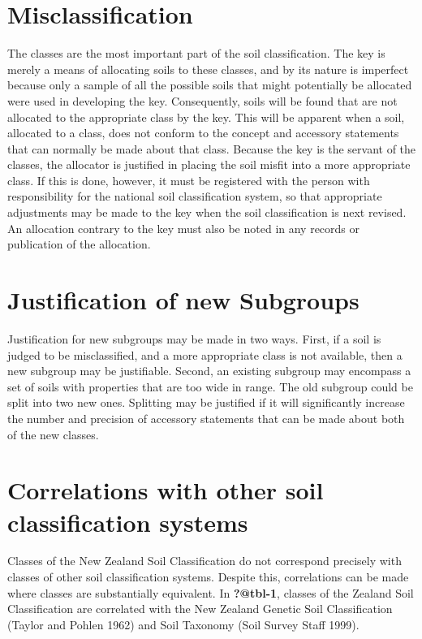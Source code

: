 \documentclass[
  letterpaper,
  DIV=11,
  numbers=noendperiod]{scrreprt}
\begin{document}
\hypertarget{sec-intro-misclass}{%
\section{Misclassification}\label{sec-intro-misclass}}

The classes are the most important part of the soil classification. The
key is merely a means of allocating soils to these classes, and by its
nature is imperfect because only a sample of all the possible soils that
might potentially be allocated were used in developing the key.
Consequently, soils will be found that are not allocated to the
appropriate class by the key. This will be apparent when a soil,
allocated to a class, does not conform to the concept and accessory
statements that can normally be made about that class. Because the key
is the servant of the classes, the allocator is justified in placing the
soil misfit into a more appropriate class. If this is done, however, it
must be registered with the person with responsibility for the national
soil classification system, so that appropriate adjustments may be made
to the key when the soil classification is next revised. An allocation
contrary to the key must also be noted in any records or publication of
the allocation.

\hypertarget{sec-intro-new-sgs}{%
\section{Justification of new Subgroups}\label{sec-intro-new-sgs}}

Justification for new subgroups may be made in two ways. First, if a
soil is judged to be misclassified, and a more appropriate class is not
available, then a new subgroup may be justifiable. Second, an existing
subgroup may encompass a set of soils with properties that are too wide
in range. The old subgroup could be split into two new ones. Splitting
may be justified if it will significantly increase the number and
precision of accessory statements that can be made about both of the new
classes.

\hypertarget{sec-intro-correls}{%
\section{Correlations with other soil classification
systems}\label{sec-intro-correls}}

Classes of the New Zealand Soil Classification do not correspond
precisely with classes of other soil classification systems. Despite
this, correlations can be made where classes are substantially
equivalent. In \textbf{?@tbl-1}, classes of the Zealand Soil
Classification are correlated with the New Zealand Genetic Soil
Classification (Taylor and Pohlen 1962) and Soil Taxonomy (Soil Survey
Staff 1999).
\end{document}
